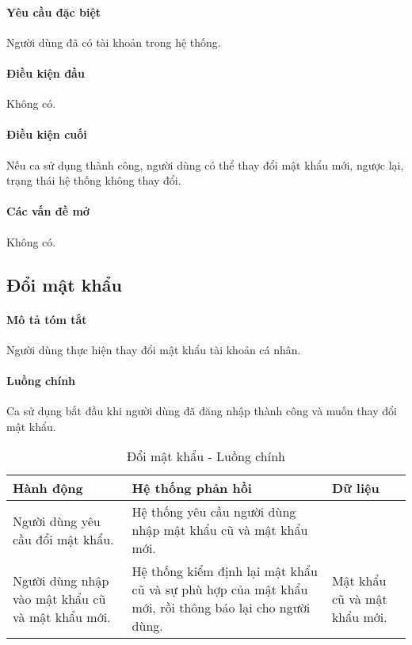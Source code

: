 \documentclass[./../main.tex]{subfiles}
\begin{document}
\paragraph*{Yêu cầu đặc biệt}

Người dùng đã có tài khoản trong hệ thống.

\paragraph*{Điều kiện đầu}

Không có.

\paragraph*{Điều kiện cuối}

Nếu ca sử dụng thành công, người dùng có thể thay đổi mật khẩu mới,
ngược lại, trạng thái hệ thống không thay đổi.

\paragraph*{Các vấn đề mở}

Không có.

\subsection{Đổi mật khẩu}

\paragraph*{Mô tả tóm tắt}

Người dùng thực hiện thay đổi mật khẩu tài khoản cá nhân.


\paragraph*{Luồng chính} Ca sử dụng bắt đầu khi người dùng đã đăng nhập thành công và muốn thay đổi mật khẩu.

\begin{table}[H]
  \caption{Đổi mật khẩu - Luồng chính}
  \label{tab:change_password}
  \begin{tabularx}{\textwidth}{|X|X|X|}
  \hline
  \textbf{Hành động}                               & \textbf{Hệ thống phản hồi}                                                                           & \textbf{Dữ liệu}             \\ \hline
  Người dùng yêu cầu đổi mật khẩu.                 & Hệ thống yêu cầu người dùng nhập mật khẩu cũ và mật khẩu mới.                                        &                              \\ \hline
  Người dùng nhập vào mật khẩu cũ và mật khẩu mới. & Hệ thống kiểm định lại mật khẩu cũ và sự phù hợp của mật khẩu mới, rồi thông báo lại cho người dùng. & Mật khẩu cũ và mật khẩu mới. \\ \hline
  \end{tabularx}
\end{table}
\end{document}
